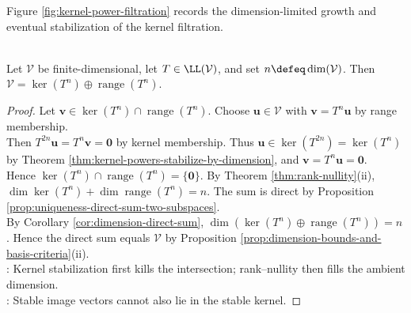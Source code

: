 Figure \ref{fig:kernel-power-filtration} records the dimension-limited growth and eventual stabilization of the kernel filtration.

\begin{illustrationfigure}[H]
  \centering
  
  \caption{The kernel filtration grows until it stabilizes; after equality appears once, the tail is constant.}
  \label{fig:kernel-power-filtration}
\end{illustrationfigure}

\begin{theorem} \label{thm:kernel-range-stable-direct-sum} \\
Let $\mathcal{V}$ be finite-dimensional, let $T\in\LL(\mathcal{V})$, and set $n\defeq\dim(\mathcal{V})$. Then $\mathcal{V}=\ker(T^n)\oplus\operatorname{range}(T^n)$.
\begin{proof}
Let $\mathbf{v}\in\ker(T^n)\cap\operatorname{range}(T^n)$. Choose $\mathbf{u}\in\mathcal{V}$ with $\mathbf{v}=T^n\mathbf{u}$ by range membership.\\
Then $T^{2n}\mathbf{u}=T^n\mathbf{v}=\mathbf{0}$ by kernel membership. Thus $\mathbf{u}\in\ker(T^{2n})=\ker(T^n)$ by Theorem \ref{thm:kernel-powers-stabilize-by-dimension}, and $\mathbf{v}=T^n\mathbf{u}=\mathbf{0}$.\\
Hence $\ker(T^n)\cap\operatorname{range}(T^n)=\{\mathbf{0}\}$. By Theorem \ref{thm:rank-nullity}(ii), $\dim\ker(T^n)+\dim\operatorname{range}(T^n)=n$. The sum is direct by Proposition \ref{prop:uniqueness-direct-sum-two-subspaces}.\\
By Corollary \ref{cor:dimension-direct-sum}, $\dim(\ker(T^n)\oplus\operatorname{range}(T^n))=n$. Hence the direct sum equals $\mathcal{V}$ by Proposition \ref{prop:dimension-bounds-and-basis-criteria}(ii).\\
: Kernel stabilization first kills the intersection; rank--nullity then fills the ambient dimension.\\
: Stable image vectors cannot also lie in the stable kernel.
\end{proof}
\end{theorem}

